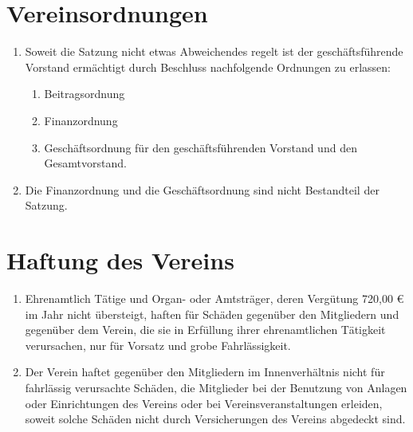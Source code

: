 \documentclass[a4paper,ngerman]{scrartcl}
\begin{document}
\section{Vereinsordnungen}
\begin{enumerate}
\item Soweit die Satzung nicht etwas Abweichendes regelt ist der geschäftsführende Vorstand ermächtigt durch Beschluss nachfolgende Ordnungen zu erlassen:
\begin{enumerate}
\item Beitragsordnung
\item Finanzordnung
\item Geschäftsordnung für den geschäftsführenden Vorstand und den Gesamtvorstand.
\end{enumerate}
\item Die Finanzordnung und die Geschäftsordnung sind nicht Bestandteil der Satzung.
\end{enumerate}

\section{Haftung des Vereins}
\begin{enumerate}
\item Ehrenamtlich Tätige und Organ- oder Amtsträger, deren Vergütung 720,00
€ im Jahr nicht übersteigt, haften für Schäden gegenüber den Mitgliedern
und gegenüber dem Verein, die sie in Erfüllung ihrer ehrenamtlichen
Tätigkeit verursachen, nur für Vorsatz und grobe Fahrlässigkeit.
\item Der Verein haftet gegenüber den Mitgliedern im Innenverhältnis nicht für fahrlässig verursachte Schäden, die Mitglieder bei der Benutzung von Anlagen oder Einrichtungen des Vereins oder bei Vereinsveranstaltungen erleiden, soweit solche Schäden nicht durch Versicherungen des Vereins abgedeckt sind.
\end{enumerate}
\end{document}

